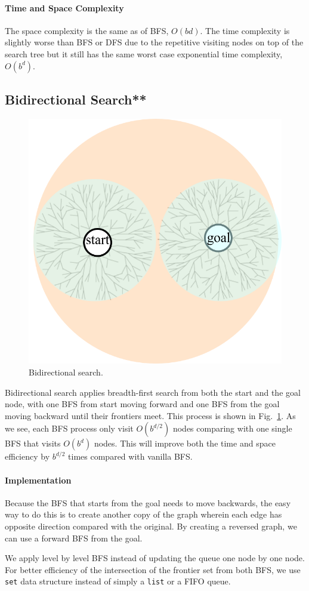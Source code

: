 \documentclass[main.tex]{subfiles}
\begin{document}
\paragraph{Time and Space Complexity}
The space complexity is the same as of BFS, $O(bd)$. The time complexity is slightly worse than BFS or DFS due to the repetitive visiting nodes on top of the search tree but it still has the same worst case exponential time complexity, $O(b^d)$. 
\subsection{Bidirectional Search**}
\begin{figure}[!ht]
    \centering
    \includegraphics[width=0.5\columnwidth]{fig/bidrectional_search.png}
        \caption{Bidirectional search. }
    \label{fig:bidirectional_search}
\end{figure}
Bidirectional search applies breadth-first search from both the start and the goal node, with one BFS from start moving forward and one BFS from the goal moving backward until their frontiers meet. This process is shown in Fig.~\ref{fig:bidirectional_search}. As we see, each BFS process only visit $O(b^{d/2})$ nodes comparing with one single BFS that visits $O(b^d)$ nodes. This will improve both the time and space efficiency by $b^{d/2}$ times compared with vanilla BFS. 
\paragraph{Implementation} Because the BFS that starts from the goal needs to move backwards, the easy way to do this is to create another copy of the graph wherein each edge has opposite direction compared with the original. By creating a reversed graph, we can use a forward BFS from the goal. 

We apply level by level BFS instead of updating the queue one node by one node. For better efficiency of the intersection of the frontier set from both BFS, we use \texttt{set} data structure instead of simply a \texttt{list} or a FIFO queue. 
\end{document}
